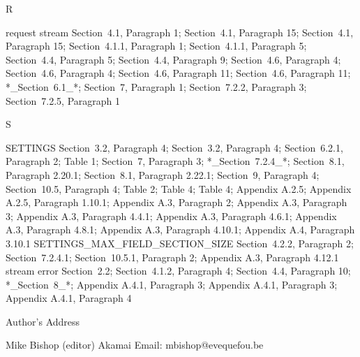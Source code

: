 \documentclass{article}
\begin{document}
R

request stream  Section~4.1, Paragraph 1; Section~4.1, Paragraph 15; Section~4.1, Paragraph 15; Section~4.1.1, Paragraph 1; Section~4.1.1, Paragraph 5; Section~4.4, Paragraph 5; Section~4.4, Paragraph 9; Section~4.6, Paragraph 4; Section~4.6, Paragraph 4; Section~4.6, Paragraph 11; Section~4.6, Paragraph 11; *\_Section~6.1\_*; Section~7, Paragraph 1; Section~7.2.2, Paragraph 3; Section~7.2.5, Paragraph 1

S

SETTINGS  Section~3.2, Paragraph 4; Section~3.2, Paragraph 4; Section~6.2.1, Paragraph 2; Table 1; Section~7, Paragraph 3; *\_Section~7.2.4\_*; Section~8.1, Paragraph 2.20.1; Section~8.1, Paragraph 2.22.1; Section~9, Paragraph 4; Section~10.5, Paragraph 4; Table 2; Table 4; Table 4; Appendix A.2.5; Appendix A.2.5, Paragraph 1.10.1; Appendix A.3, Paragraph 2; Appendix A.3, Paragraph 3; Appendix A.3, Paragraph 4.4.1; Appendix A.3, Paragraph 4.6.1; Appendix A.3, Paragraph 4.8.1; Appendix A.3, Paragraph 4.10.1; Appendix A.4, Paragraph 3.10.1 SETTINGS\_MAX\_FIELD\_SECTION\_SIZE  Section~4.2.2, Paragraph 2; Section~7.2.4.1; Section~10.5.1, Paragraph 2; Appendix A.3, Paragraph 4.12.1 stream error  Section~2.2; Section~4.1.2, Paragraph 4; Section~4.4, Paragraph 10; *\_Section~8\_*; Appendix A.4.1, Paragraph 3; Appendix A.4.1, Paragraph 3; Appendix A.4.1, Paragraph 4

Author's Address

Mike Bishop (editor) Akamai Email: mbishop@evequefou.be
\end{document}
